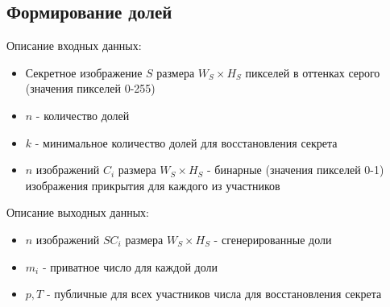 \documentclass[a4paper,article,14pt]{extarticle}
\begin{document}
\subsection{Формирование долей}
Описание входных данных:

\begin{itemize}
    \item Секретное изображение $S$ размера $W_S \times H_S$ пикселей в оттенках серого (значения пикселей 0-255)
    \item $n$ - количество долей
    \item $k$ - минимальное количество долей для восстановления секрета
    \item $n$ изображений $C_i$ размера $W_S \times H_S$ - бинарные (значения пикселей 0-1) изображения прикрытия для каждого из участников
\end{itemize}

Описание выходных данных:

\begin{itemize}
    \item $n$ изображений $SC_i$ размера $W_S \times H_S$ - сгенерированные доли
    \item $m_i$ - приватное число для каждой доли
    \item $p, T$ - публичные для всех участников числа для восстановления секрета
\end{itemize}
\end{document}

